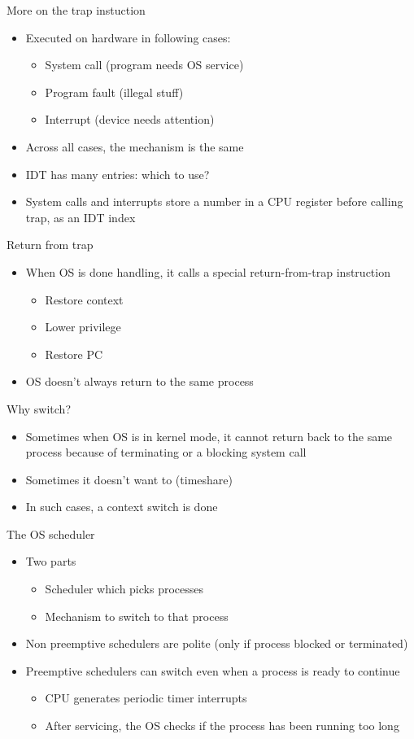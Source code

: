 \documentclass[12pt]{article}
\begin{document}
More on the trap instuction
\begin{itemize}
    \item Executed on hardware in following cases:
    \begin{itemize}
        \item System call (program needs OS service)
        \item Program fault (illegal stuff)
        \item Interrupt (device needs attention)
    \end{itemize}
    \item Across all cases, the mechanism is the same
    \item IDT has many entries: which to use?
    \item System calls and interrupts store a number in a CPU register before calling trap, as an IDT index
\end{itemize}

Return from trap 
\begin{itemize}
    \item When OS is done handling, it calls a special return-from-trap instruction 
    \begin{itemize}
        \item Restore context
        \item Lower privilege
        \item Restore PC
    \end{itemize}
    \item OS doesn't always return to the same process
\end{itemize}

Why switch?
\begin{itemize}
    \item Sometimes when OS is in kernel mode, it cannot return back to the same process because of terminating or a blocking system call
    \item Sometimes it doesn't want to (timeshare)
    \item In such cases, a context switch is done
\end{itemize}

The OS scheduler
\begin{itemize}
    \item Two parts
    \begin{itemize}
        \item Scheduler which picks processes
        \item Mechanism to switch to that process
    \end{itemize}
    \item Non preemptive schedulers are polite (only if process blocked or terminated)
    \item Preemptive schedulers can switch even when a process is ready to continue
    \begin{itemize}
        \item CPU generates periodic timer interrupts
        \item After servicing, the OS checks if the process has been running too long
    \end{itemize}
\end{itemize}
\end{document}
